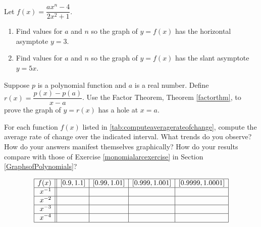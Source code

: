 \begin{exenum}
\item  Let  $f(x) = \dfrac{ax^{n} -4}{2x^2+1}$.

\begin{enumerate}

\item  Find values for $a$ and $n$ so the graph of $y = f(x)$  has the horizontal asymptote $y = 3$.

\item  Find values for $a$ and $n$ so the graph of  $y=f(x)$ has the slant asymptote $y = 5x$.

\end{enumerate}

\item  Suppose $p$ is a polynomial function and $a$ is a real number.  Define $r(x)= \dfrac{p(x) - p(a)}{x-a}$.  Use the Factor Theorem, Theorem \ref{factorthm}, to prove the graph of $y = r(x)$ has a hole at $x =a$.


\item \label{laurentarcexercise}For each function $f(x)$ listed in \autoref{tab:computeaveragerateofchange}, compute the average rate of change over the indicated interval.
What trends do you observe?  How do your answers manifest themselves graphically?  How do your results compare with those of Exercise \ref{monomialarcexercise} in Section \ref{GraphsofPolynomials}?

\begin{ftable}
\[ \begin{array}{|r||c|c|c|c|}  \hline

 f(x) &  [0.9, 1.1] & [0.99, 1.01] &[0.999, 1.001] & [0.9999, 1.0001]  \\ \hline
 x^{-1} &&&&   \\  \hline
 x^{-2} &&&&    \\  \hline
 x^{-3} &&&&   \\  \hline
 x^{-4} &&&&   \\  \hline
\end{array} \]
\caption{}
\label{tab:computeaveragerateofchange}
\end{ftable}


\end{exenum}
